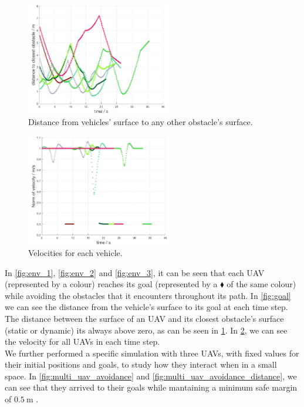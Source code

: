 \documentclass[journal]{IEEEtran}
\begin{document}
		\begin{figure}[h]
			\centering
			\includegraphics[width=2.5in]{Results/Potentialfields/obst}
			\caption{Distance from vehicles' surface to any other obstacle's surface.}
			\label{fig:obst}
		\end{figure}
	
		\begin{figure}[h]
			\centering
			\includegraphics[width=2.5in]{Results/Potentialfields/vel}
			\caption{Velocities for each vehicle.}
			\label{fig:vel}
		\end{figure}

			
		In \figurename{ \ref{fig:env_1}}, \figurename{ \ref{fig:env_2}} and \figurename{ \ref{fig:env_3}}, it can be seen that each UAV (represented by a colour) reaches its goal (represented by a $\blacklozenge$ of the same colour) while avoiding the obstacles that it encounters throughout its path. In \figurename{ \ref{fig:goal}} we can see the distance from the vehicle's surface to its goal at each time step. The distance between the surface of an UAV and its closest obstacle's surface (static or dynamic) its always above zero, as can be seen in \figurename{ \ref{fig:obst}}. In \figurename{ \ref{fig:vel}}, we can see the velocity for all UAVs in each time step.\\
		
		We further performed a specific simulation with three UAVs, with fixed values for their initial positions and goals, to study how they interact when in a small space. In \figurename{ \ref{fig:multi_uav_avoidance}} and \figurename{ \ref{fig:multi_uav_avoidance_distance}}, we can see that they arrived to their goals while mantaining a minimum safe margin of $\SI{0.5}{\meter}$ .\\
		
\end{document}
